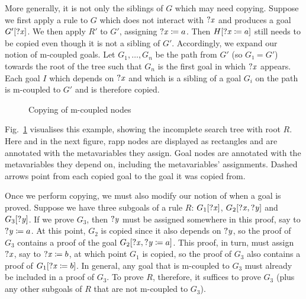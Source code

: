More generally, it is not only the siblings of $G$ which may need copying.
Suppose we first apply a rule to $G$ which does not interact with $\mathit{?x}$ and
produces a goal $G'[\mathit{?x}]$. We then apply $R'$ to $G'$, assigning
$\mathit{?x} \coloneqq a$. Then $H[\mathit{?x} \coloneqq a]$ still needs to be copied even
though it is not a sibling of $G'$. Accordingly, we expand our notion of
m-coupled goals. Let $G_{1}, \dots, G_{n}$ be the path from $G'$ (so $G₁ = G'$)
towards the root of the tree such that $G_{n}$ is the first goal in which
$\mathit{?x}$ appears. Each goal $I$ which depends on $\mathit{?x}$ and which is a sibling
of a goal $G_{i}$ on the path is m-coupled to $G'$ and is therefore copied.

\begin{figure}
  \caption{Copying of m-coupled nodes}%
  \label{fig:mvars-path}
\end{figure}

Fig.~\ref{fig:mvars-path} visualises this example, showing the incomplete search
tree with root $R$. Here and in the next figure, rapp nodes are displayed as
rectangles and are annotated with the metavariables they assign. Goal nodes are
annotated with the metavariables they depend on, including the metavariables'
assignments. Dashed arrows point from each copied goal to the goal it was copied
from.

Once we perform copying, we must also modify our notion of when a goal is
proved. Suppose we have three subgoals of a rule $R$: $G_{1}[\mathit{?x}]$,
$G_{2}[\mathit{?x}, \mathit{?y}]$ and $G_{3}[\mathit{?y}]$. If we prove $G_{3}$, then $\mathit{?y}$
must be assigned somewhere in this proof, say to $\mathit{?y} \coloneqq a$. At this
point, $G_{2}$ is copied since it also depends on $\mathit{?y}$, so the proof of
$G_{3}$ contains a proof of the goal $G_{2}[\mathit{?x}, \mathit{?y} \coloneqq a]$. This
proof, in turn, must assign $\mathit{?x}$, say to $\mathit{?x} \coloneqq b$, at which
point $G_{1}$ is copied, so the proof of $G_{3}$ also contains a proof of
$G_{1}[\mathit{?x} \coloneqq b]$. In general, any goal that is m-coupled to $G_{3}$
must already be included in a proof of $G_{3}$. To prove $R$, therefore, it
suffices to prove $G_{3}$ (plus any other subgoals of $R$ that are not m-coupled
to $G_{3}$).

